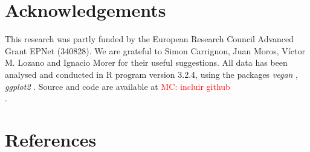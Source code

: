 \documentclass[review]{elsarticle}
\newcommand{\memo}[2]{\textcolor{#1}{#2}}
\newcommand{\maria}[1]{\memo{red}{MC: #1\\}}
\begin{document}
\section{Acknowledgements}

This research was partly funded by the European Research Council Advanced Grant EPNet (340828). We are grateful to Simon Carrignon, Juan Moros, Víctor M. Lozano and Ignacio Morer for their useful suggestions.  
All data has been analysed and conducted in R program version 3.2.4, using the packages \textit{vegan} \citep{oksanen_vegan_2007}, \textit{ggplot2} \citep{ggplot2:_2016}. Source and code are available at \maria{incluir github}. 

\section{References}

%

\end{document}
